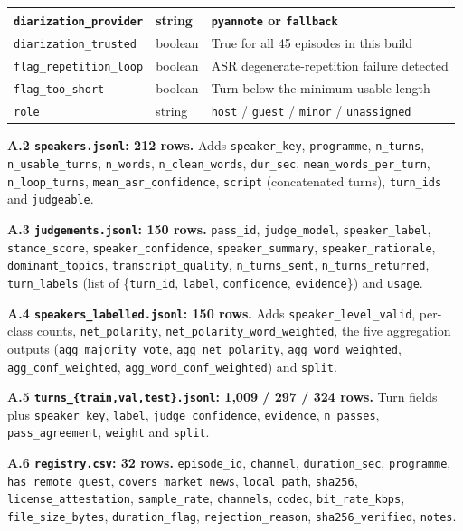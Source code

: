 \documentclass[11pt,a4paper]{article}
\begin{document}
\begin{longtable}{|L{3.4cm}|L{2.0cm}|L{9.6cm}|}
\texttt{diarization\_provider}  & string  & \texttt{pyannote} or \texttt{fallback} \\ \hline
\texttt{diarization\_trusted}   & boolean & True for all 45 episodes in this build \\ \hline
\texttt{flag\_repetition\_loop} & boolean & ASR degenerate-repetition failure detected \\ \hline
\texttt{flag\_too\_short}       & boolean & Turn below the minimum usable length \\ \hline
\texttt{role}                   & string  & \texttt{host} / \texttt{guest} / \texttt{minor} / \texttt{unassigned} \\ \hline
\end{longtable}
\addtocounter{table}{-1}

\textbf{A.2 \texttt{speakers.jsonl}: 212 rows.} Adds \texttt{speaker\_key}, \texttt{programme},
\texttt{n\_turns}, \texttt{n\_usable\_turns}, \texttt{n\_words}, \texttt{n\_clean\_words},
\texttt{dur\_sec}, \texttt{mean\_words\_per\_turn}, \texttt{n\_loop\_turns},
\texttt{mean\_asr\_confidence}, \texttt{script} (concatenated turns), \texttt{turn\_ids} and
\texttt{judgeable}.

\textbf{A.3 \texttt{judgements.jsonl}: 150 rows.} \texttt{pass\_id}, \texttt{judge\_model},
\texttt{speaker\_label}, \texttt{stance\_score}, \texttt{speaker\_confidence},
\texttt{speaker\_summary}, \texttt{speaker\_rationale}, \texttt{dominant\_topics},
\texttt{transcript\_quality}, \texttt{n\_turns\_sent}, \texttt{n\_turns\_returned},
\texttt{turn\_labels} (list of \{\texttt{turn\_id}, \texttt{label}, \texttt{confidence},
\texttt{evidence}\}) and \texttt{usage}.

\textbf{A.4 \texttt{speakers\_labelled.jsonl}: 150 rows.} Adds \texttt{speaker\_level\_valid},
per-class counts, \texttt{net\_polarity}, \texttt{net\_polarity\_word\_weighted}, the five
aggregation outputs (\texttt{agg\_majority\_vote}, \texttt{agg\_net\_polarity},
\texttt{agg\_word\_weighted}, \texttt{agg\_conf\_weighted}, \texttt{agg\_word\_conf\_weighted})
and \texttt{split}.

\textbf{A.5 \texttt{turns\_\{train,val,test\}.jsonl}: 1{,}009 / 297 / 324 rows.} Turn fields plus
\texttt{speaker\_key}, \texttt{label}, \texttt{judge\_confidence}, \texttt{evidence},
\texttt{n\_passes}, \texttt{pass\_agreement}, \texttt{weight} and \texttt{split}.

\textbf{A.6 \texttt{registry.csv}: 32 rows.} \texttt{episode\_id}, \texttt{channel},
\texttt{duration\_sec}, \texttt{programme}, \texttt{has\_remote\_guest},
\texttt{covers\_market\_news}, \texttt{local\_path}, \texttt{sha256},
\texttt{license\_attestation}, \texttt{sample\_rate}, \texttt{channels}, \texttt{codec},
\texttt{bit\_rate\_kbps}, \texttt{file\_size\_bytes}, \texttt{duration\_flag},
\texttt{rejection\_reason}, \texttt{sha256\_verified}, \texttt{notes}.
\end{document}
